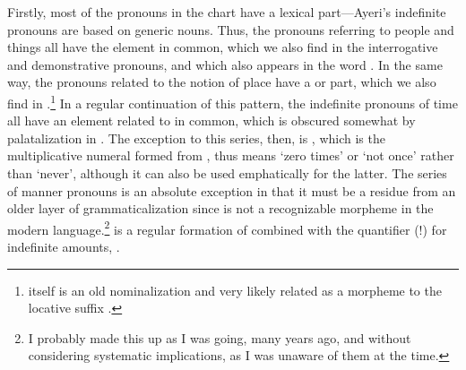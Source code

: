 Firstly, most of the pronouns in the chart have a lexical part---Ayeri's 
indefinite pronouns are based on generic nouns. Thus, the pronouns referring to 
people and things all have the  element in common, which we 
also find in the interrogative and demonstrative pronouns, and which also 
appears in the word . In the same way, the pronouns 
related to the notion of place have a  or  part, 
which we also find in .\footnote{ itself 
is an old nominalization and very likely related as a morpheme to the locative 
suffix .} In a regular continuation of this pattern, the 
indefinite pronouns of time all have an element related to 
 in common, which is obscured somewhat by palatalization 
in . The exception to this series, then, is 
, which is the multiplicative numeral formed from 
, thus means `zero times' or `not once' rather than 
`never', although it can also be used emphatically for the latter. The series 
of manner pronouns is an absolute exception in that it must be a residue from 
an older layer of grammaticalization since  is not a 
recognizable morpheme in the modern language.\footnote{I probably made this up 
as I was going, many years ago, and without considering systematic 
implications, as I was unaware of them at the time.}  
is a regular formation of  combined with the 
quantifier (!) for indefinite amounts, .

